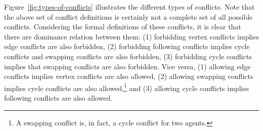 \documentclass[letterpaper]{article} %
\newcommand{\comment}[1]{{\nb{\textbf{Comment:}}{orange}{#1}}}
\begin{document}
Figure~\ref{fig:types-of-conflicts} illustrates the different types of conflicts. Note that the above set of conflict definitions is certainly not a complete set of all possible conflicts. 
Considering the formal definitions of these conflicts, it is clear that there are dominance relation between them: (1) forbidding vertex conflicts implies edge conflicts are also forbidden, (2) forbidding following conflicts implies cycle conflicts and swapping conflicts are also forbidden, (3) forbidding cycle conflicts implies that swapping conflicts are also forbidden. Vice versa, (1) allowing edge conflicts implies vertex conflicts are also allowed, 
(2) allowing swapping conflicts implies cycle conflicts are also allowed,\footnote{A swapping conflict is, in fact, a cycle conflict for two agents.}
and (3) allowing cycle conflicts implies following conflicts are also allowed.  
 


\end{document}
